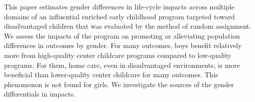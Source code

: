 \noindent This paper estimates gender differences in life-cycle impacts across multiple domains of an influential enriched early childhood program targeted toward disadvantaged children that was evaluated by the method of random assignment. We assess the impacts of the program on promoting or alleviating population differences in outcomes by gender. For many outcomes, boys benefit relatively more from high-quality center childcare programs compared to low-quality programs. For them, home care, even in disadvantaged environments, is more beneficial than lower-quality center childcare for many outcomes. This phenomenon is not found for girls. We investigate the sources of the gender differentials in impacts. 